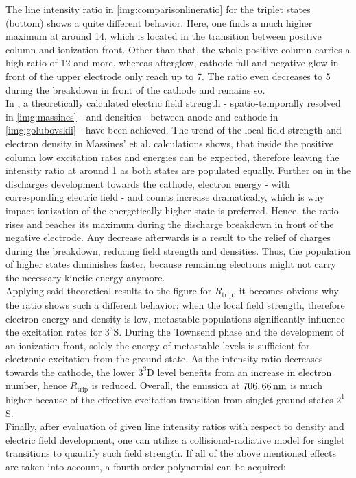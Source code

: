 \documentclass[a4paper,10pt,twoside]{article}
\newcommand{\ix}[1]{_\text{#1}}
\begin{document}
		The line intensity ratio in \autoref{img:comparisonlineratio} for the triplet states (bottom) shows a quite different behavior. Here, one finds a much higher maximum at around 14, which is located in the transition between positive column and ionization front. Other than that, the whole positive column carries a high ratio of 12 and more, whereas afterglow, cathode fall and negative glow in front of the upper electrode only reach up to 7. The ratio even decreases to 5 during the breakdown in front of the cathode and remains so.\\
		In \cite{Massines}, \cite{0022-3727-36-1-306} a theoretically calculated electric field strength - spatio-temporally resolved in \autoref{img:massines} - and densities - between anode and cathode in \autoref{img:golubovskii} - have been achieved. The trend of the local field strength and electron density in Massines' et al. calculations shows, that inside the positive column low excitation rates and energies can be expected, therefore leaving the intensity ratio at around 1 as both states are populated equally. Further on in the discharges development towards the cathode, electron energy - with corresponding electric field - and counts increase dramatically, which is why impact ionization of the energetically higher state is preferred. Hence, the ratio rises and reaches its maximum during the discharge breakdown in front of the negative electrode. Any decrease afterwards is a result to the relief of charges during the breakdown, reducing field strength and densities. Thus, the population of higher states diminishes faster, because remaining electrons might not carry the necessary kinetic energy anymore.\\
		Applying said theoretical results to the figure for $R\ix{trip}$, it becomes obvious why the ratio shows such a different behavior: when the local field strength, therefore electron energy and density is low, metastable populations significantly influence the excitation rates for $3^3$S. During the Townsend phase and the development of an ionization front, solely the energy of metastable levels is sufficient for electronic excitation from the ground state. As the intensity ratio decreases towards the cathode, the lower $3^3$D level benefits from an increase in electron number, hence $R\ix{trip}$ is reduced. Overall, the emission at $\unit[706,66]{nm}$ is much higher because of the effective excitation transition from singlet ground states $2^1$S.\\
		Finally, after evaluation of given line intensity ratios with respect to density and electric field development, one can utilize a collisional-radiative model for singlet transitions \cite{linratio1_14} to quantify such field strength. If all of the above mentioned effects are taken into account, a fourth-order polynomial can be acquired:
		
\end{document}
